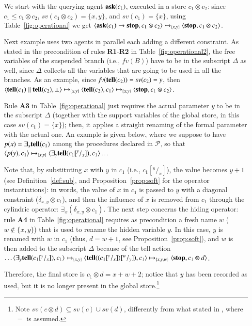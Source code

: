 \documentclass[main.tex]{subfiles}
\begin{document}
\begin{example}
	We start with the querying agent ${\bf ask}(c_1)$, executed in a store $c_1 \otimes c_2$: since $c_1 \leq c_1 \otimes c_2$, $\mathit{sv}(c_1 \otimes c_2) = \{x,y\}$, and $\mathit{sv}(c_1) = \{x\}$, using Table~\ref{fig:operational} we get
	$\langle {\bf ask}(c_1) \rightarrow \mbox{{\bf stop}}, c_1 \otimes c_2 \rangle \mapsto_{\{x,y\}} \langle \mbox{{\bf stop}}, c_1 \otimes c_2 \rangle$.
	
	Next example uses two agents in parallel each adding a different constraint.
    As stated in the precondition of rules {\bf R1}-{\bf R2} in Table~\ref{fig:operational2}, the free variables of the suspended branch (i.e., $\mathit{fv(B)}$) have to be in 
    the subscript $\Delta$ as well, since $\Delta$ collects all the variables that are going to be used in all the branches. As an example, since $\mathit{fv}({\bf tell}(c_2))= \mathit{sv}(c_2) = {y}$, then
$\langle {\bf tell}(c_1) \parallel {\bf tell}(c_2), \bot \rangle \mapsto_{\{x,y\}} \langle {\bf tell}(c_2), c_1 \rangle \mapsto_{\{x,y\}} \langle \mbox{{\bf stop}}, c_1 \otimes c_2\rangle$.
	\normalsize
\end{example}


\begin{example}
	
	Rule {\bf A3} in Table~\ref{fig:operational} just requires the actual parameter $y$ to be in the subscript
	$\Delta$ (together with the support variables of the global store, in this case $\mathit{sv}(c_1)= \{x\}$); then, it applies a straight renaming of the formal parameter with the actual one. An example is given below, where we suppose to have  $p(x) = \exists_x {\bf tell}(c_1)$ among the procedures declared in   $\mathcal{P}$, so that 
	$\langle p(y), c_1 \rangle \mapsto_{\{x,y\}} \langle \exists_y {\bf tell}(c_1[^y/_x]), c_1\rangle \dots$
	
	Note that, by substituting $x$ with $y$ in $c_1$ (i.e., $c_1[^y/_x]$), the value becomes $y + 1$ (see Definition~\ref{def:sub}, and Proposition~\ref{prop:soft} for the operator instantiations): in words, the value of $x$ in $c_1$ is passed to $y$ with a diagonal constraint ($\delta_{x,y} \otimes c_1$), and then the influence of $x$ is removed from $c_1$ through the cylindric operator: $\exists_x (\delta_{x,y} \otimes c_1)$. The  next step concerns the hiding operator: rule {\bf A4} in Table~\ref{fig:operational} requires as precondition a fresh name $w$ ($w \not\in \{x,y\}$) that is used to rename the hidden variable $y$. In this case, $y$ is renamed with $w$ in $c_1$ (thus, $d = w+1$, see Proposition~\ref{prop:soft}), and $w$ is then added to the subscript $\Delta$ because of the tell action
	$\dots \langle \exists_y {\bf tell}(c_1[^y/_x]), c_1\rangle \mapsto_{\{x,y\}} \langle {\bf tell}((c_1[^y/_x])[^w/_y]), c_1 \rangle \mapsto_{\{x,y,w\}} \langle \mbox{{\bf stop}}, c_1 \otimes d \rangle$.
	
	Therefore, the final store is $c_1 \otimes d= x + w + 2$; notice that $y$ has been recorded as used, but it is no longer present in the global store.\footnote{Note 
	$\mathit{sv}(c \otimes d) \subseteq \mathit{sv(c)} \cup \mathit{sv(d)}$, differently from what stated in \cite{scc}, where $=$ is assumed.}
\end{example}
\end{document}
